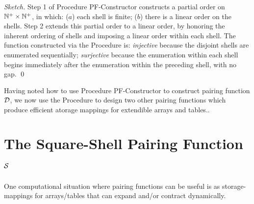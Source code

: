 \begin{proof}[Sketch]
Step 1 of Procedure {\small\sf PF-Constructor} constructs a partial order on $\mathbb{N}^+ \times \mathbb{N}^+$, in which: ($a$) each shell is finite; ($b$) there is a linear order on the shells.  Step 2 extends this partial order to a linear order, by honoring the inherent ordering of shells and imposing a linear order within each shell.  The function constructed via the Procedure is: {\em injective} because the disjoint shells are enumerated sequentially; {\em surjective} because the enumeration within each shell begins immediately after the enumeration within the preceding shell, with no gap.  \qed
\end{proof}

\bigskip

Having noted how to use Procedure {\small\sf PF-Constructor} to construct pairing function $\mbox{$\cal D$}$,  we now use the Procedure to design two other pairing functions which produce efficient atorage mappings for extendible arrays and tables..

\section{The Square-Shell Pairing Function $\mbox{$\cal S$}$}
\label{sec:square-pair-fn}

One computational situation where pairing functions can be useful is as storage-mappings for arrays/tables that can expand and/or contract dynamically.

\medskip

